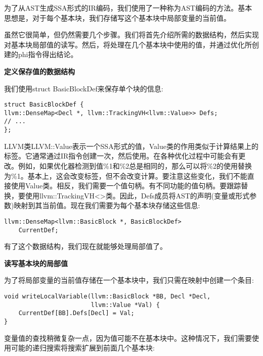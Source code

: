 为了从AST生成SSA形式的IR编码，我们使用了一种称为AST编码的方法。基本思想是，对于每个基本块，我们存储写这个基本块中局部变量的当前值。\par

虽然它很简单，但仍然需要几个步骤。我们将首先介绍所需的数据结构，然后实现对基本块局部值的读写。然后，将处理在几个基本块中使用的值，并通过优化所创建的phi指令得出结论。\par

\hspace*{\fill} \par %
\textbf{定义保存值的数据结构}

我们使用struct BasicBlockDef来保存单个块的信息:\par

\begin{lstlisting}[caption={}]
struct BasicBlockDef {
llvm::DenseMap<Decl *, llvm::TrackingVH<llvm::Value>> Defs;
// ...
};
\end{lstlisting}

LLVM类LLVM::Value表示一个SSA形式的值，Value类的作用类似于计算结果上的标签。它通常通过IR指令创建一次，然后使用。在各种优化过程中可能会有更改。例如，如果优化器检测到值\%1和\%2总是相同的，那么可以将\%2的使用替换为\%1。基本上，这会改变标签，但不会改变计算。要注意这些变化，我们不能直接使用Value类。相反，我们需要一个值句柄。有不同功能的值句柄。要跟踪替换，要使用llvm::TrackingVH<>类。因此，Defs成员将AST的声明(变量或形式参数)映射到其当前值。现在我们需要为每个基本块存储这些信息:\par

\begin{lstlisting}[caption={}]
llvm::DenseMap<llvm::BasicBlock *, BasicBlockDef>
	CurrentDef;
\end{lstlisting}

有了这个数据结构，我们现在就能够处理局部值了。\par

\hspace*{\fill} \par %
\textbf{读写基本块的局部值}

为了将局部变量的当前值存储在一个基本块中，我们只需在映射中创建一个条目:\par

\begin{lstlisting}[caption={}]
void writeLocalVariable(llvm::BasicBlock *BB, Decl *Decl,
						llvm::Value *Val) {
	CurrentDef[BB].Defs[Decl] = Val;
}
\end{lstlisting}

变量值的查找稍微复杂一点，因为值可能不在基本块中。这种情况下，我们需要使用可能的递归搜索将搜索扩展到前面几个基本块:\par

